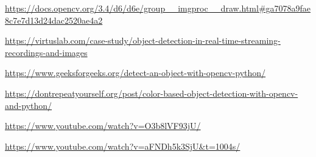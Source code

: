 \documentclass{article}
\begin{document}
\begin{thebibliography}{9}
\url{https://docs.opencv.org/3.4/d6/d6e/group__imgproc__draw.html#ga7078a9fae8c7e7d13d24dac2520ae4a2}

\url{https://virtuslab.com/case-study/object-detection-in-real-time-streaming-recordings-and-images}

\url{https://www.geeksforgeeks.org/detect-an-object-with-opencv-python/}

\url{https://dontrepeatyourself.org/post/color-based-object-detection-with-opencv-and-python/}

\url{https://www.youtube.com/watch?v=O3b8lVF93jU/}

\url{https://www.youtube.com/watch?v=aFNDh5k3SjU&t=1004s/}

\end{thebibliography}
\end{document}
